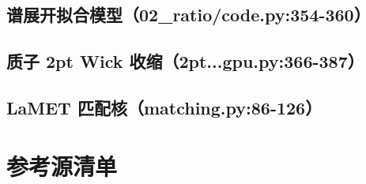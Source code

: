 \documentclass[UTF8]{ctexart}
\begin{document}
\subsection{谱展开拟合模型（02\_ratio/code.py:354-360）}



\subsection{质子 2pt Wick 收缩（2pt...gpu.py:366-387）}



\subsection{LaMET 匹配核（matching.py:86-126）}



\section{参考源清单}
\end{document}
